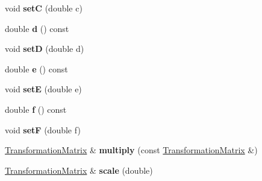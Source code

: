 \begin{DoxyCompactItemize}
\item 
\mbox{\label{class_web_core_1_1_transformation_matrix_a7048345453203464ca121b6e59ea11a7}} 
void {\bfseries setC} (double c)
\item 
\mbox{\label{class_web_core_1_1_transformation_matrix_aa79b6dcc8dd52100031f6d3e39b9bca2}} 
double {\bfseries d} () const
\item 
\mbox{\label{class_web_core_1_1_transformation_matrix_ad33825ea15442ee7297c9d64d391f72d}} 
void {\bfseries setD} (double d)
\item 
\mbox{\label{class_web_core_1_1_transformation_matrix_a08e5bd2aecab30bec14a73a12761ec39}} 
double {\bfseries e} () const
\item 
\mbox{\label{class_web_core_1_1_transformation_matrix_a16ac6e001a668dc80062c5bac90543cc}} 
void {\bfseries setE} (double e)
\item 
\mbox{\label{class_web_core_1_1_transformation_matrix_a2d721f33a62a2b0b44e6757d7752f74d}} 
double {\bfseries f} () const
\item 
\mbox{\label{class_web_core_1_1_transformation_matrix_a41b35d4f5b63df0cee882c96cb2075c0}} 
void {\bfseries setF} (double f)
\item 
\mbox{\label{class_web_core_1_1_transformation_matrix_a38933f62af3f0245096b06e35d6ae579}} 
\mbox{\hyperlink{class_web_core_1_1_transformation_matrix}{Transformation\+Matrix}} \& {\bfseries multiply} (const \mbox{\hyperlink{class_web_core_1_1_transformation_matrix}{Transformation\+Matrix}} \&)
\item 
\mbox{\label{class_web_core_1_1_transformation_matrix_ad77c78b8db35c605f5e17407bf6fda26}} 
\mbox{\hyperlink{class_web_core_1_1_transformation_matrix}{Transformation\+Matrix}} \& {\bfseries scale} (double)
\item 

\end{DoxyCompactItemize}
